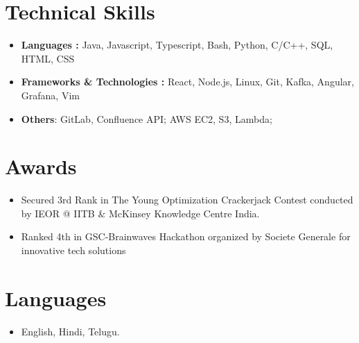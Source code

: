 \documentclass[letterpaper,11pt]{article}
\newcommand{\resumeSubItemListStart}{\begin{itemize}[leftmargin=*]}
\newcommand{\resumeSubItemListEnd}{\end{itemize}}
\begin{document}
\section{Technical Skills}
  \resumeSubItemListStart
    \item{ \textbf{Languages : }{Java, Javascript, Typescript, Bash, Python, C/C++, SQL, HTML, CSS} }
    \item{ \textbf{Frameworks \& Technologies : }{React, Node.js, Linux, Git, Kafka, Angular, Grafana, Vim} }
    \item{ \textbf{Others}: GitLab, Confluence API; AWS EC2, S3, Lambda;  }
  \resumeSubItemListEnd
  
\section{Awards}
  \resumeSubItemListStart
    \item{ {Secured 3rd Rank in The Young Optimization Crackerjack Contest conducted by IEOR @ IITB \& McKinsey Knowledge Centre India.} }
    \item{ {Ranked 4th in GSC-Brainwaves Hackathon organized by Societe Generale for innovative tech solutions} }
  \resumeSubItemListEnd

\section{Languages}
  \resumeSubItemListStart
    \item{ {English, Hindi, Telugu.} }
  \resumeSubItemListEnd

\end{document}

